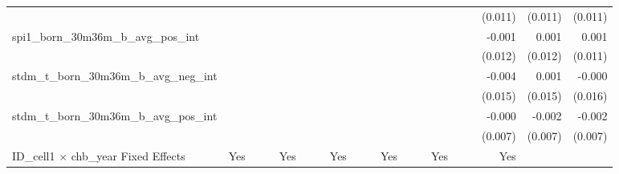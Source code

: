 \begin{tabular}{lrrrrrrrrrrrrrrrrrr}
                                            &              &              &              &              &              &              &              &              &               &              &              &               &              &              &               &      (0.011) &      (0.011) &       (0.011) \\ 
spi1\_born\_30m36m\_b\_avg\_pos\_int        &              &              &              &              &              &              &              &              &               &              &              &               &              &              &               &       -0.001 &        0.001 &         0.001 \\ 
                                            &              &              &              &              &              &              &              &              &               &              &              &               &              &              &               &      (0.012) &      (0.012) &       (0.011) \\ 
stdm\_t\_born\_30m36m\_b\_avg\_neg\_int     &              &              &              &              &              &              &              &              &               &              &              &               &              &              &               &       -0.004 &        0.001 &        -0.000 \\ 
                                            &              &              &              &              &              &              &              &              &               &              &              &               &              &              &               &      (0.015) &      (0.015) &       (0.016) \\ 
stdm\_t\_born\_30m36m\_b\_avg\_pos\_int     &              &              &              &              &              &              &              &              &               &              &              &               &              &              &               &       -0.000 &       -0.002 &        -0.002 \\ 
                                            &              &              &              &              &              &              &              &              &               &              &              &               &              &              &               &      (0.007) &      (0.007) &       (0.007) \\ 
\midrule
ID\_cell1 $\times$ chb\_year Fixed Effects  &          Yes &              &              &          Yes &              &              &          Yes &              &               &          Yes &              &               &          Yes &              &               &          Yes &              &               \\ 

\end{tabular}
